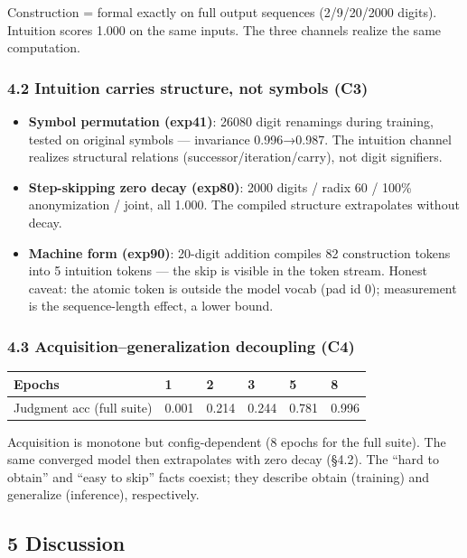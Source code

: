 \documentclass[
]{article}
\providecommand{\tightlist}{%
  \setlength{\itemsep}{0pt}\setlength{\parskip}{0pt}}
\begin{document}
Construction = formal exactly on full output sequences (2/9/20/2000
digits). Intuition scores 1.000 on the same inputs. The three channels
realize the same computation.

\subsubsection{4.2 Intuition carries structure, not symbols
(C3)}\label{intuition-carries-structure-not-symbols-c3}

\begin{itemize}
\tightlist
\item
  \textbf{Symbol permutation (exp41)}: 26080 digit renamings during
  training, tested on original symbols --- invariance 0.996→0.987. The
  intuition channel realizes structural relations
  (successor/iteration/carry), not digit signifiers.
\item
  \textbf{Step-skipping zero decay (exp80)}: 2000 digits / radix 60 /
  100\% anonymization / joint, all 1.000. The compiled structure
  extrapolates without decay.
\item
  \textbf{Machine form (exp90)}: 20-digit addition compiles 82
  construction tokens into 5 intuition tokens --- the skip is visible in
  the token stream. Honest caveat: the atomic token is outside the model
  vocab (pad id 0); measurement is the sequence-length effect, a lower
  bound.
\end{itemize}

\subsubsection{4.3 Acquisition--generalization decoupling
(C4)}\label{acquisitiongeneralization-decoupling-c4}

\begin{longtable}[]{@{}llllll@{}}
\toprule\noalign{}
Epochs & 1 & 2 & 3 & 5 & 8 \\
\midrule\noalign{}
\endhead
\bottomrule\noalign{}
\endlastfoot
Judgment acc (full suite) & 0.001 & 0.214 & 0.244 & 0.781 & 0.996 \\
\end{longtable}

Acquisition is monotone but config-dependent (8 epochs for the full
suite). The same converged model then extrapolates with zero decay
(§4.2). The ``hard to obtain'' and ``easy to skip'' facts coexist; they
describe obtain (training) and generalize (inference), respectively.

\subsection{5 Discussion}\label{discussion}
\end{document}
